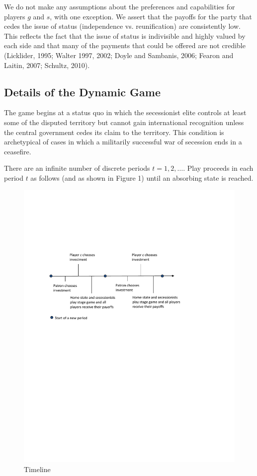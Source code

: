 We do not make any assumptions about the preferences and capabilities for players $g$ and $s$, with one exception. We assert that the payoffs for the party that cedes the issue of status (independence vs. reunification) are consistently low. This reflects the fact that the issue of status is indivisible and highly valued by each side and that many of the payments that could be offered are not credible (Licklider, 1995; Walter 1997, 2002; Doyle and Sambanis, 2006; Fearon and Laitin, 2007; Schultz, 2010).


\subsection{Details of the Dynamic Game}
\label{sec:structure}

The game begins at a status quo in which the secessionist elite controls at least some of the disputed territory but cannot gain international recognition unless the central government cedes its claim to the territory. This condition is archetypical of cases in which a militarily successful war of secession ends in a ceasefire.  

There are an infinite number of discrete periods $t=1,2,\ldots$. Play proceeds in each period $t$ as follows (and as shown in Figure 1) until an absorbing state is reached.

\begin{figure}
\includegraphics{Timeline2.pdf}
\caption{Timeline}
\end{figure}

